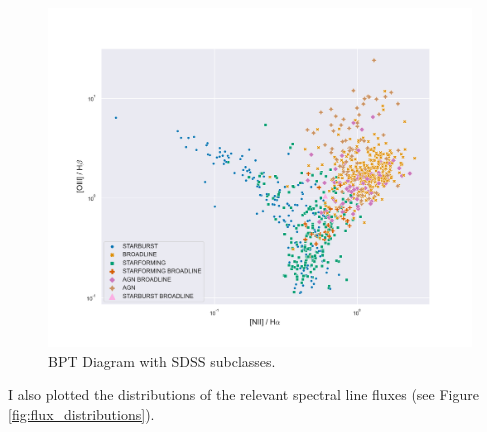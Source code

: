 \documentclass[letterpaper, oneside]{article}
\begin{document}
\begin{figure}[h]
	\centering
	\includegraphics[width=1.1\textwidth]{../BPT_diagram_sdss_subclasses.pdf}
	\caption{BPT Diagram with SDSS subclasses.}
	\label{fig:BPT_subclasses}
\end{figure}

I also plotted the distributions of the relevant spectral line fluxes (see Figure \ref{fig:flux_distributions}).
\end{document}
